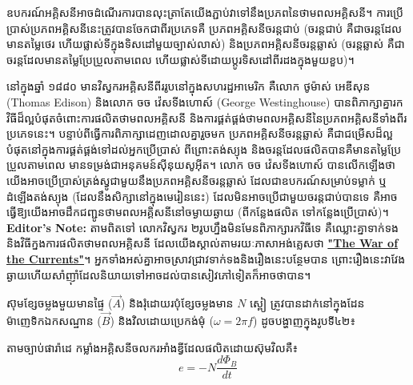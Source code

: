 \clearpage
{}
\tanbgdivider

ឧបករណ៍អគ្គិសនីអាចដំណើរការបានលុះត្រាតែយើងភ្ជាប់វាទៅនឹងប្រភពនៃថាមពលអគ្គិសនី។ ការប្រើប្រាស់ប្រភពអគ្គិសនីនេះត្រូវបានចែកជាពីរប្រភេទគឺ ប្រភពអគ្គិសនីចរន្តជាប់ (ចរន្តជាប់ គឺជាចរន្តដែលមានតម្លៃថេរ ហើយផ្លាស់ទីក្នុងទិសដៅមួយច្បាស់លាស់) និងប្រភពអគ្គិសនីចរន្តឆ្លាស់ (ចរន្តឆ្លាស់ គឺជាចរន្តដែលមានតម្លៃប្រែប្រួលតាមពេល ហើយផ្លាស់ទីដោយប្ដូរទិសដៅពីរដងក្នុងមួយខួប)។

\vspace{0.3em}
នៅក្នុងឆ្នាំ ១៨៨០ មានវិស្វករអគ្គិសនីពីររូបនៅក្នុងសហរដ្ឋអាមេរិក គឺលោក ថូម៉ាស់ អេឌីសុន ({\englishfont Thomas Edison}) និងលោក ចច វ៉េសទីងហោស៍ ({\englishfont George Westinghouse}) បានពិភាក្សាគ្នារកវិធីដ៏ល្អបំផុតចំពោះការផលិតថាមពលអគ្គិសនី និងការផ្គត់ផ្គង់ថាមពលអគ្គិសនីនៃប្រភពអគ្គិសនីទាំងពីរប្រភេទនេះ។ បន្ទាប់ពីធ្វើការពិភាក្សាដេញដោលគ្នារួចមក ប្រភពអគ្គិសនីចរន្តឆ្លាស់ គឺជាជម្រើសដ៏ល្អបំផុតនៅក្នុងការផ្គត់ផ្គង់ទៅដល់អ្នកប្រើប្រាស់ ពីព្រោះតង់ស្យុង និងចរន្តដែលផលិតបានគឺមានតម្លៃប្រែប្រួលតាមពេល មានទម្រង់ជាអនុគមន៍ស៊ីនុយសូអុីត។ លោក ចច វ៉េសទីងហោស៍ បានលើកឡើងថា យើងអាចប្រើប្រាស់ត្រង់ស្វូជាមួយនឹងប្រភពអគ្គិសនីចរន្តឆ្លាស់ ដែលជាឧបករណ៍សម្រាប់ទម្លាក់ ឬដំឡើងតង់ស្យុង (ដែលនឹងសិក្សានៅក្នុងមេរៀននេះ) ដែលមិនអាចប្រើជាមួយចរន្តជាប់បានទេ គឺអាចធ្វើឱ្យយើងអាចដឹកជញ្ជូនថាមពលអគ្គិសនីនៅចម្ងាយឆ្ងាយ (ពីកន្លែងផលិត ទៅកន្លែងប្រើប្រាស់)។\\

\vspace{0.3em}
\textbf{Editor's Note:} តាមពិតទៅ លោកវិស្វករ ២រូបហ្នឹងមិនមែនពិភាក្សារកវិធីទេ គឺឈ្លោះគ្នាទាក់ទងនិងវិធីក្នងការផលិតថាមពលអគ្គិសនី ដែលយើងស្គាល់តាមរយៈភាសាអង់គ្លេសថា \href{https://www.energy.gov/articles/war-currents-ac-vs-dc-power}{\textcolor{brownheader}{\textbf{"The War of the Currents"}}}។
អ្នកទាំងអស់គ្នាអាចស្រាវជ្រាវទាក់ទងនិងរឿងនេះបន្ថែមបាន ព្រោះរឿងនេះវាវែងឆ្ងាយហើយសាំញុាំដែលនិយាយទៅអាចដល់បានសៀវភៅទៀតក៏អាចថាបាន។


\noindent
ស៊ុមខ្សែចម្លងមួយមានផ្ទៃ ($\vec{A}$) និងរុំដោយរបុំខ្សែចម្លងមាន $N$ ស្ពៀ ត្រូវបានដាក់នៅក្នុងដែនម៉ាញេទិកឯកសណ្ឋាន ($\vec{B}$) និងវិលដោយប្រេកង់មុំ ($\omega = 2\pi f$) ដូចបង្ហាញក្នុងរូបទី៤២៖

\vspace{0.4em}
\begin{center}
\end{center}

\vspace{0.4em}
\noindent
តាមច្បាប់ផារ៉ាដេ កម្លាំងអគ្គិសនីចលករអាំងឌ្វីដែលផលិតដោយស៊ុមវិលគឺ៖
\begin{equation*}
	e = -N\dfrac{d\Phi_B}{dt}
\end{equation*}

